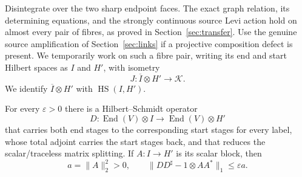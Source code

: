 Disintegrate over the two sharp endpoint faces.  The exact graph
relation, its determining equations, and the strongly continuous source
Levi action hold on almost every pair of fibres, as proved in
Section~\ref{sec:transfer}.  Use the genuine source amplification of
Section~\ref{sec:links} if a projective composition defect is present.
We temporarily work on such a fibre pair, writing its end and start
Hilbert spaces as $I$ and $H'$, with isometry
\[
 J:\overline I\otimes H'\longrightarrow\mathcal K.
\]
We identify $\overline I\otimes H'$ with
$\operatorname{HS}(I,H')$.

\begin{lemma}\label{lem:panels-compact-graph}
For every $\varepsilon>0$ there is a Hilbert--Schmidt operator
\[
 D:\operatorname{End}(V)\otimes I
       \longrightarrow\operatorname{End}(V)\otimes H'
\]
that carries both end stages to the corresponding start stages for every
label, whose total adjoint carries the start stages back, and that reduces
the scalar/traceless matrix splitting.  If $A:I\to H'$ is its scalar
block, then
\begin{equation}\label{eq:panels-compact-approximation}
 a=\|A\|_2^2>0,
 \qquad
 \|DD^\sharp-1\otimes AA^*\|_1\leq\varepsilon a.
\end{equation}
\end{lemma}

